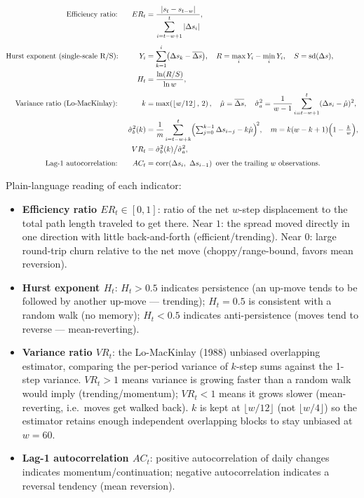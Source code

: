 \begin{equation}
\begin{aligned}
\text{Efficiency ratio: } && ER_t &= \frac{\left|s_t - s_{t-w}\right|}{\displaystyle\sum_{i=t-w+1}^{t} \left|\Delta s_i\right|}, \\[4pt]
\text{Hurst exponent (single-scale R/S): } && Y_i &= \sum_{k=1}^{i}\bigl(\Delta s_k - \overline{\Delta s}\bigr),\quad
R = \max_i Y_i - \min_i Y_i,\quad S = \operatorname{sd}(\Delta s), \\
&& H_t &= \frac{\ln(R/S)}{\ln w}, \\[4pt]
\text{Variance ratio (Lo-MacKinlay): } && k &= \max\!\left(\left\lfloor w/12\right\rfloor,\,2\right),\quad
\hat\mu = \overline{\Delta s},\quad \hat\sigma_a^2 = \frac{1}{w-1}\sum_{i=t-w+1}^{t}(\Delta s_i - \hat\mu)^2, \\
&& \hat\sigma_b^2(k) &= \frac{1}{m}\sum_{i=t-w+k}^{t}\Bigl(\textstyle\sum_{j=0}^{k-1}\Delta s_{i-j} - k\hat\mu\Bigr)^{\!2},\quad
m = k(w-k+1)\Bigl(1-\tfrac{k}{w}\Bigr), \\
&& VR_t &= \hat\sigma_b^2(k)\big/\hat\sigma_a^2, \\[4pt]
\text{Lag-1 autocorrelation: } && AC_t &= \operatorname{corr}\!\left(\Delta s_i,\ \Delta s_{i-1}\right) \text{ over the trailing } w \text{ observations}.
\end{aligned}
\end{equation}

Plain-language reading of each indicator:
\begin{itemize}
\item \textbf{Efficiency ratio $ER_t \in [0,1]$}: ratio of the net $w$-step displacement to
the total path length traveled to get there. Near $1$: the spread moved directly in one
direction with little back-and-forth (efficient/trending). Near $0$: large round-trip
churn relative to the net move (choppy/range-bound, favors mean reversion).
\item \textbf{Hurst exponent $H_t$}: $H_t>0.5$ indicates persistence (an up-move tends to
be followed by another up-move --- trending); $H_t=0.5$ is consistent with a random
walk (no memory); $H_t<0.5$ indicates anti-persistence (moves tend to reverse ---
mean-reverting).
\item \textbf{Variance ratio $VR_t$}: the Lo-MacKinlay (1988) unbiased overlapping
estimator, comparing the per-period variance of $k$-step sums against the 1-step
variance. $VR_t>1$ means variance is growing faster than a random walk would imply
(trending/momentum); $VR_t<1$ means it grows slower (mean-reverting, i.e.\ moves get
walked back). $k$ is kept at $\lfloor w/12\rfloor$ (not $\lfloor w/4\rfloor$) so the
estimator retains enough independent overlapping blocks to stay unbiased at $w=60$.
\item \textbf{Lag-1 autocorrelation $AC_t$}: positive autocorrelation of daily changes
indicates momentum/continuation; negative autocorrelation indicates a reversal
tendency (mean reversion).
\end{itemize}

